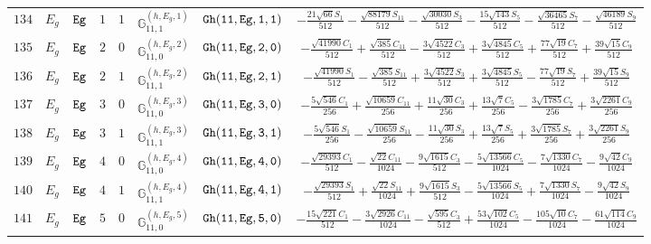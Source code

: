 \documentclass[fleqn,8pt]{jsarticle}
\begin{document}
\begin{table}[ht!]
\begin{center}
\begin{tabular}{cccccccc}
$ 134 $ & $ E_{g} $ & $ {\tt Eg} $ & $ 1 $ & $ 1 $ & $ \mathbb{G}_{11,1}^{(h,E_{g},1)} $ & $ {\tt Gh(11,Eg,1,1)} $ & $ - \frac{21 \sqrt{66} S_{1}}{512} - \frac{\sqrt{88179} S_{11}}{512} - \frac{\sqrt{30030} S_{3}}{512} - \frac{15 \sqrt{143} S_{5}}{512} - \frac{\sqrt{36465} S_{7}}{512} - \frac{\sqrt{46189} S_{9}}{512} $ \\
$ 135 $ & $ E_{g} $ & $ {\tt Eg} $ & $ 2 $ & $ 0 $ & $ \mathbb{G}_{11,0}^{(h,E_{g},2)} $ & $ {\tt Gh(11,Eg,2,0)} $ & $ - \frac{\sqrt{41990} C_{1}}{512} + \frac{\sqrt{385} C_{11}}{512} - \frac{3 \sqrt{4522} C_{3}}{512} + \frac{3 \sqrt{4845} C_{5}}{512} + \frac{77 \sqrt{19} C_{7}}{512} + \frac{39 \sqrt{15} C_{9}}{512} $ \\
$ 136 $ & $ E_{g} $ & $ {\tt Eg} $ & $ 2 $ & $ 1 $ & $ \mathbb{G}_{11,1}^{(h,E_{g},2)} $ & $ {\tt Gh(11,Eg,2,1)} $ & $ - \frac{\sqrt{41990} S_{1}}{512} - \frac{\sqrt{385} S_{11}}{512} + \frac{3 \sqrt{4522} S_{3}}{512} + \frac{3 \sqrt{4845} S_{5}}{512} - \frac{77 \sqrt{19} S_{7}}{512} + \frac{39 \sqrt{15} S_{9}}{512} $ \\
$ 137 $ & $ E_{g} $ & $ {\tt Eg} $ & $ 3 $ & $ 0 $ & $ \mathbb{G}_{11,0}^{(h,E_{g},3)} $ & $ {\tt Gh(11,Eg,3,0)} $ & $ - \frac{5 \sqrt{546} C_{1}}{256} + \frac{\sqrt{10659} C_{11}}{256} + \frac{11 \sqrt{30} C_{3}}{256} + \frac{13 \sqrt{7} C_{5}}{256} - \frac{3 \sqrt{1785} C_{7}}{256} + \frac{3 \sqrt{2261} C_{9}}{256} $ \\
$ 138 $ & $ E_{g} $ & $ {\tt Eg} $ & $ 3 $ & $ 1 $ & $ \mathbb{G}_{11,1}^{(h,E_{g},3)} $ & $ {\tt Gh(11,Eg,3,1)} $ & $ - \frac{5 \sqrt{546} S_{1}}{256} - \frac{\sqrt{10659} S_{11}}{256} - \frac{11 \sqrt{30} S_{3}}{256} + \frac{13 \sqrt{7} S_{5}}{256} + \frac{3 \sqrt{1785} S_{7}}{256} + \frac{3 \sqrt{2261} S_{9}}{256} $ \\
$ 139 $ & $ E_{g} $ & $ {\tt Eg} $ & $ 4 $ & $ 0 $ & $ \mathbb{G}_{11,0}^{(h,E_{g},4)} $ & $ {\tt Gh(11,Eg,4,0)} $ & $ - \frac{\sqrt{29393} C_{1}}{512} - \frac{\sqrt{22} C_{11}}{1024} - \frac{9 \sqrt{1615} C_{3}}{512} - \frac{5 \sqrt{13566} C_{5}}{1024} - \frac{7 \sqrt{1330} C_{7}}{1024} - \frac{9 \sqrt{42} C_{9}}{1024} $ \\
$ 140 $ & $ E_{g} $ & $ {\tt Eg} $ & $ 4 $ & $ 1 $ & $ \mathbb{G}_{11,1}^{(h,E_{g},4)} $ & $ {\tt Gh(11,Eg,4,1)} $ & $ - \frac{\sqrt{29393} S_{1}}{512} + \frac{\sqrt{22} S_{11}}{1024} + \frac{9 \sqrt{1615} S_{3}}{512} - \frac{5 \sqrt{13566} S_{5}}{1024} + \frac{7 \sqrt{1330} S_{7}}{1024} - \frac{9 \sqrt{42} S_{9}}{1024} $ \\
$ 141 $ & $ E_{g} $ & $ {\tt Eg} $ & $ 5 $ & $ 0 $ & $ \mathbb{G}_{11,0}^{(h,E_{g},5)} $ & $ {\tt Gh(11,Eg,5,0)} $ & $ - \frac{15 \sqrt{221} C_{1}}{512} - \frac{3 \sqrt{2926} C_{11}}{1024} - \frac{\sqrt{595} C_{3}}{512} + \frac{53 \sqrt{102} C_{5}}{1024} - \frac{105 \sqrt{10} C_{7}}{1024} - \frac{61 \sqrt{114} C_{9}}{1024} $ \\

\end{tabular}
\end{center}
\end{table}
\end{document}

